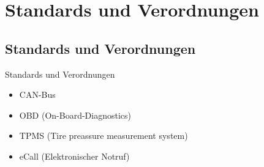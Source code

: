 \section{Standards und Verordnungen}

\subsection{Standards und Verordnungen}

\begin{frame}{Standards und Verordnungen}
    \begin{itemize}
        \item CAN-Bus
        \item OBD (On-Board-Diagnostics)
        \item TPMS (Tire preassure measurement system)
        \item eCall (Elektronischer Notruf)
    \end{itemize}
\end{frame}